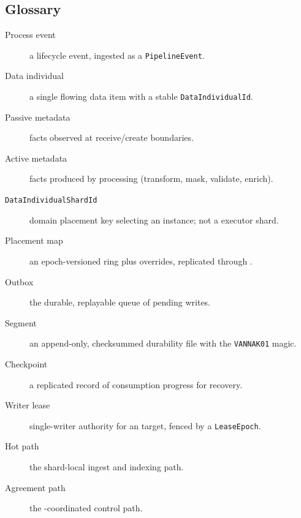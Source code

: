 \subsection{Glossary}

\begin{description}
\item[Process event] a \durga{} lifecycle event, ingested as a
  \texttt{PipelineEvent}.
\item[Data individual] a single flowing data item with a stable
  \texttt{DataIndividualId}.
\item[Passive metadata] facts observed at receive/create boundaries.
\item[Active metadata] facts produced by processing (transform, mask, validate,
  enrich).
\item[\texttt{DataIndividualShardId}] domain placement key selecting an \ipto{}
  instance; not a \sitas{} executor shard.
\item[Placement map] an epoch-versioned ring plus overrides, replicated through
  \raft{}.
\item[Outbox] the durable, replayable queue of pending \ipto{} writes.
\item[Segment] an append-only, checksummed durability file with the
  \texttt{VANNAK01} magic.
\item[Checkpoint] a replicated record of consumption progress for recovery.
\item[Writer lease] single-writer authority for an \ipto{} target, fenced by a
  \texttt{LeaseEpoch}.
\item[Hot path] the shard-local ingest and indexing path.
\item[Agreement path] the \raft{}-coordinated control path.
\end{description}

\endinput
